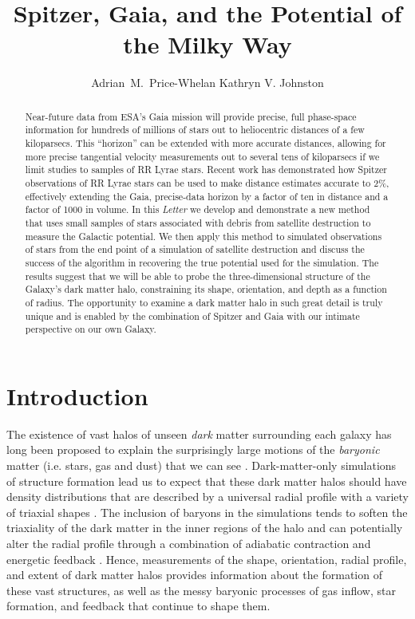 \documentclass{emulateapj}
\begin{document}
\title{Spitzer, Gaia, and the Potential of the Milky Way}

\author{Adrian~M.~Price-Whelan Kathryn V. Johnston}


\begin{abstract}

Near-future data from ESA's Gaia mission will provide precise, full phase-space information for hundreds of millions of stars out to heliocentric distances of a few kiloparsecs. This ``horizon'' can be extended with more accurate distances, allowing for more precise tangential velocity measurements out to several tens of kiloparsecs if we limit studies to samples of RR Lyrae stars. Recent work has demonstrated how Spitzer observations of RR Lyrae stars can be used to make distance estimates accurate to 2\%, effectively extending the Gaia, precise-data horizon by a factor of ten in distance and a factor of 1000 in volume. In this \emph{Letter} we develop and demonstrate a new method that uses small samples of stars associated with debris from satellite destruction to measure the Galactic potential. We then apply this method to simulated observations of stars from the end point of a simulation of satellite destruction and discuss the success of the algorithm in recovering the true potential used for the simulation. The results suggest that we will be able to probe the three-dimensional structure of the Galaxy's dark matter halo, constraining its shape, orientation, and depth as a function of radius. The opportunity to examine a dark matter halo in such great detail is truly unique and is enabled by the combination of Spitzer and Gaia with our intimate perspective on our own Galaxy.

\end{abstract}


\section{Introduction}
\label{intro.sec}
 The existence of vast halos of unseen {\it dark} matter surrounding each galaxy has long been proposed to explain the surprisingly large
motions of the {\it baryonic} matter (i.e. stars, gas and dust) that we can see \citep[e.g.,][]{rubin70}.
Dark-matter-only simulations of structure formation lead us to expect that these dark matter halos should have density distributions that are described by a universal radial profile \citep{navarro96} with a variety of triaxial shapes \citep{jing02}.
The inclusion of baryons in the simulations tends to soften the triaxiality of the dark matter in the inner regions of the halo \citep[e.g., as the disk forms,][]{bailin05} and
can potentially alter the radial profile through a combination of adiabatic contraction and energetic feedback \citep[e.g.][]{pontzen12}.
Hence, measurements of the shape, orientation, radial profile, and extent of dark matter halos provides information about the formation of these vast structures, as well as the messy baryonic processes of gas inflow, star formation, and feedback that continue to shape them.
\end{document}
